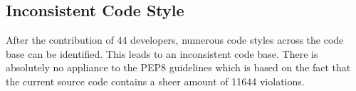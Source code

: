 \subsection{Inconsistent Code Style}
After the contribution of 44 developers, numerous code styles across the code base can be identified. This leads to an inconsistent code base. There is absolutely no appliance to the PEP8 guidelines which is based on the fact that the current source code contains a sheer amount of 11644 violations.








